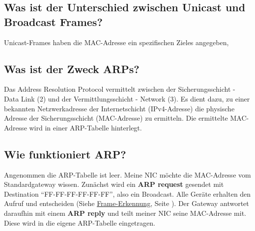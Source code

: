 \subsection*{Was ist der Unterschied zwischen \flqq Unicast\frqq{} und \flqq Broadcast\frqq{} Frames?}
Unicast-Frames haben die MAC-Adresse ein spezifischen Zieles angegeben,

\subsection*{Was ist der Zweck ARPs?}
Das Address Resolution Protocol vermittelt zwischen der Sicherungsschicht - Data Link (2) und der Vermittlungsschicht - Network (3). Es dient dazu, zu einer bekannten Netzwerkadresse der Internetschicht (IPv4-Adresse) die physische Adresse der Sicherungsschicht (MAC-Adresse) zu ermitteln. Die ermittelte MAC-Adresse wird in einer ARP-Tabelle hinterlegt.

\subsection*{Wie funktioniert ARP?}
Angenommen die ARP-Tabelle ist leer. Meine NIC möchte die MAC-Adresse vom Standardgateway wissen. Zunächst wird ein \textbf{ARP request} gesendet mit Destination "`FF-FF-FF-FF-FF-FF"', also ein Broadcast. Alle Geräte erhalten den Aufruf und entscheiden (Siehe \underline{\hyperref[sub:Frameerkennung]{Frame-Erkennung}}, Seite \pageref{sub:Frameerkennung}). Der Gateway antwortet daraufhin mit einem \textbf{ARP reply} und teilt meiner NIC seine MAC-Adresse mit. Diese wird in die eigene ARP-Tabelle eingetragen.
